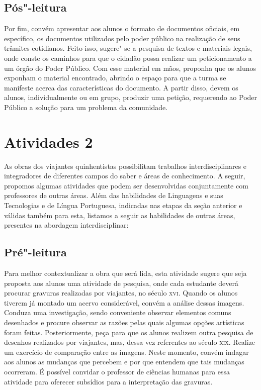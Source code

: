 \documentclass[12pt]{extarticle}
\begin{document}
\subsection{Pós"-leitura}


Por fim, convém apresentar aos alunos o formato de
documentos oficiais, em específico, os documentos utilizados pelo poder
público na realização de seus trâmites cotidianos. Feito isso, sugere"-se
a pesquisa de textos e materiais legais, onde conste os caminhos para
que o cidadão possa realizar um peticionamento a um órgão do Poder
Público. Com esse material em mãos, proponha que os alunos exponham o
material encontrado, abrindo o espaço para que a turma se manifeste
acerca das características do documento. A partir disso, devem os
alunos, individualmente ou em grupo, produzir uma petição, requerendo ao
Poder Público a solução para um problema da comunidade.

\section{Atividades 2}

As obras dos viajantes quinhentistas possibilitam trabalhos
interdisciplinares e integradores de diferentes campos do saber e áreas
de conhecimento. A seguir, propomos algumas atividades que podem ser
desenvolvidas conjuntamente com professores de outras áreas. Além das
habilidades de Linguagens e suas Tecnologias e de Língua Portuguesa,
indicadas nas etapas da seção anterior e válidas também para esta,
listamos a seguir as habilidades de outras áreas, presentes na abordagem
interdisciplinar:


\subsection{Pré"-leitura}

Para melhor contextualizar a obra que será lida, esta
atividade sugere que seja proposta aos alunos uma atividade de pesquisa,
onde cada estudante deverá procurar gravuras realizadas por viajantes,
no século \textsc{xvi}. Quando os alunos tiverem já montado um acervo
considerável, convém a análise dessas imagens. Conduza uma investigação,
sendo conveniente observar elementos comuns desenhados e procure
observar as razões pelas quais algumas opções artísticas foram feitas.
Posteriormente, peça para que os alunos realizem outra pesquisa de
desenhos realizados por viajantes, mas, dessa vez referentes ao século
\textsc{xix}. Realize um exercício de comparação entre as imagens. Neste momento,
convém indagar aos alunos as mudanças que percebem e por que entendem
que tais mudanças ocorreram. É possível convidar o professor de ciências
humanas para essa atividade para oferecer subsídios para a interpretação
das gravuras.
\end{document}
